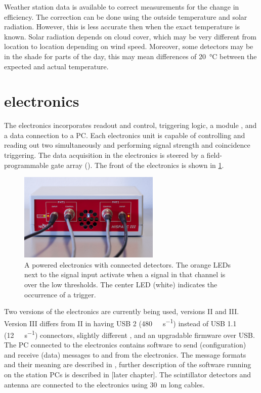 Weather station data is available to correct measurements for the change in efficiency. The correction can be done using the outside temperature and solar radiation. However, this is less accurate then when the exact \pmt temperature is known. Solar radiation depends on cloud cover, which may be very different from location to location depending on wind speed. Moreover, some detectors may be in the shade for parts of the day, this may mean differences of \SI{20}{\degreeCelsius} between the expected and actual temperature.


\section{\hisparc electronics}

The \hisparc electronics incorporates \pmt readout and control, triggering logic, a \gps module \cite{trimble2007resolutiont}, and a data connection to a PC. Each \hisparc electronics unit is capable of controlling and reading out two \pmts simultaneously and performing signal strength and coincidence triggering. The data acquisition in the electronics is steered by a field-programmable gate array (\fpga). The front of the electronics is shown in \cref{fig:hisparciii_front}.

\begin{figure}
    \centering
    \includegraphics[width=0.6\textwidth]
                    {plots/station/hisparciii_front_power_hit_trigger.png}
    \caption{A powered \hisparc electronics with connected detectors. The orange LEDs next to the signal input activate when a signal in that channel is over the low thresholds. The center LED (white) indicates the occurrence of a trigger.}
    \label{fig:hisparciii_front}
\end{figure}

Two versions of the electronics are currently being used, versions II and III. Version III differs from II in having USB 2 (\SI{480}{\mega\bit\per\second}) instead of USB 1.1 (\SI{12}{\mega\bit\per\second}) connectors, slightly different \adcs, and an upgradable firmware over USB. The PC connected to the electronics contains software to send (configuration) and receive (data) messages to and from the \hisparc electronics. The message formats and their meaning are described in \cite{verkooijen2008firmware}, further description of the software running on the station PCs is described in [later chapter]. The scintillator detectors and \gps antenna \cite{trimble2015bullet} are connected to the electronics using \SI{30}{\meter} long cables.


